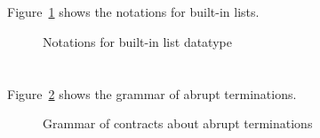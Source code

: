 \subsection{}
\nodiff

\subsection{}
\nodiff

Figure~\ref{fig:gram:list} shows the notations for built-in lists.
\begin{figure}[t]
  \begin{cadre}
      
    \end{cadre}
  \caption{Notations for built-in list datatype}
\label{fig:gram:list}
\end{figure}


\section{}
\label{sec:abrupt}

\nodiff

Figure~\ref{fig:gram:abrupt} shows the grammar of abrupt terminations.

\begin{figure}[htbp]
  \begin{cadre}
    
  \end{cadre}
  \caption{Grammar of contracts about abrupt terminations}
  \label{fig:gram:abrupt}
\end{figure}


\section{}
\label{sec:func-dep}
\experimental


